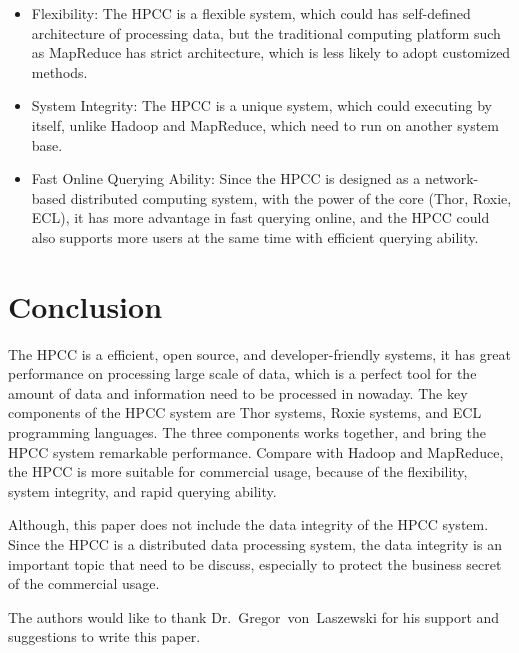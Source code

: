 \begin{itemize}
	\item Flexibility: The HPCC is a flexible system, which could has self-defined architecture of processing data, but the traditional computing platform such as MapReduce has strict architecture, which is less likely to adopt customized methods.
	\item System Integrity: The HPCC is a unique system, which could executing by itself, unlike Hadoop and MapReduce, which need to run on another system base.
	\item Fast Online Querying Ability: Since the HPCC is designed as a network-based distributed computing system, with the power of the core (Thor, Roxie, ECL), it has more advantage in fast querying online, and the HPCC could also supports more users at the same time with efficient querying ability.
\end{itemize}

\section{Conclusion}

The HPCC is a efficient, open source, and developer-friendly systems, it has great performance on processing large scale of data, which is a perfect tool for the amount of data and information need to be processed in nowaday. The key components of the HPCC system are Thor systems, Roxie systems, and ECL programming languages. The three components works together, and bring the HPCC system remarkable performance. Compare with Hadoop and MapReduce, the HPCC is more suitable for commercial usage, because of the flexibility, system integrity, and rapid querying ability.

Although, this paper does not include the data integrity of the HPCC system. Since the HPCC is a distributed data processing system, the data integrity is an important topic that need to be discuss, especially to protect the business secret of the commercial usage.

\begin{acks}

  The authors would like to thank Dr.~Gregor~von~Laszewski for his
  support and suggestions to write this paper.

\end{acks}


 

